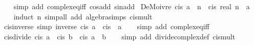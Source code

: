 \begin{isabellebody}
%
\isadelimproof
\ \ %
\endisadelimproof
%
\isatagproof
{}\isamarkupfalse%
\ {\isacharparenleft}{\kern0pt}simp\ add{\isacharcolon}{\kern0pt}\ complex{\isacharunderscore}{\kern0pt}eq{\isacharunderscore}{\kern0pt}iff\ cos{\isacharunderscore}{\kern0pt}add\ sin{\isacharunderscore}{\kern0pt}add{\isacharparenright}{\kern0pt}%
\endisatagproof
{\isafoldproof}%
%
\isadelimproof
\isanewline
%
\endisadelimproof
\isanewline
{}\isamarkupfalse%
\ DeMoivre{\isacharcolon}{\kern0pt}\ {\isachardoublequoteopen}{\isacharparenleft}{\kern0pt}cis\ a{\isacharparenright}{\kern0pt}\ {\isacharcircum}{\kern0pt}\ n\ {\isacharequal}{\kern0pt}\ cis\ {\isacharparenleft}{\kern0pt}real\ n\ {\isacharasterisk}{\kern0pt}\ a{\isacharparenright}{\kern0pt}{\isachardoublequoteclose}\isanewline
%
\isadelimproof
\ \ %
\endisadelimproof
%
\isatagproof
{}\isamarkupfalse%
\ {\isacharparenleft}{\kern0pt}induct\ n{\isacharparenright}{\kern0pt}\ {\isacharparenleft}{\kern0pt}simp{\isacharunderscore}{\kern0pt}all\ add{\isacharcolon}{\kern0pt}\ algebra{\isacharunderscore}{\kern0pt}simps\ cis{\isacharunderscore}{\kern0pt}mult{\isacharparenright}{\kern0pt}%
\endisatagproof
{\isafoldproof}%
%
\isadelimproof
\isanewline
%
\endisadelimproof
\isanewline
{}\isamarkupfalse%
\ cis{\isacharunderscore}{\kern0pt}inverse\ {\isacharbrackleft}{\kern0pt}simp{\isacharbrackright}{\kern0pt}{\isacharcolon}{\kern0pt}\ {\isachardoublequoteopen}inverse\ {\isacharparenleft}{\kern0pt}cis\ a{\isacharparenright}{\kern0pt}\ {\isacharequal}{\kern0pt}\ cis\ {\isacharparenleft}{\kern0pt}{\isacharminus}{\kern0pt}\ a{\isacharparenright}{\kern0pt}{\isachardoublequoteclose}\isanewline
%
\isadelimproof
\ \ %
\endisadelimproof
%
\isatagproof
{}\isamarkupfalse%
\ {\isacharparenleft}{\kern0pt}simp\ add{\isacharcolon}{\kern0pt}\ complex{\isacharunderscore}{\kern0pt}eq{\isacharunderscore}{\kern0pt}iff{\isacharparenright}{\kern0pt}%
\endisatagproof
{\isafoldproof}%
%
\isadelimproof
\isanewline
%
\endisadelimproof
\isanewline
{}\isamarkupfalse%
\ cis{\isacharunderscore}{\kern0pt}divide{\isacharcolon}{\kern0pt}\ {\isachardoublequoteopen}cis\ a\ {\isacharslash}{\kern0pt}\ cis\ b\ {\isacharequal}{\kern0pt}\ cis\ {\isacharparenleft}{\kern0pt}a\ {\isacharminus}{\kern0pt}\ b{\isacharparenright}{\kern0pt}{\isachardoublequoteclose}\isanewline
%
\isadelimproof
\ \ %
\endisadelimproof
%
\isatagproof
{}\isamarkupfalse%
\ {\isacharparenleft}{\kern0pt}simp\ add{\isacharcolon}{\kern0pt}\ divide{\isacharunderscore}{\kern0pt}complex{\isacharunderscore}{\kern0pt}def\ cis{\isacharunderscore}{\kern0pt}mult{\isacharparenright}{\kern0pt}%

\end{isabellebody}

